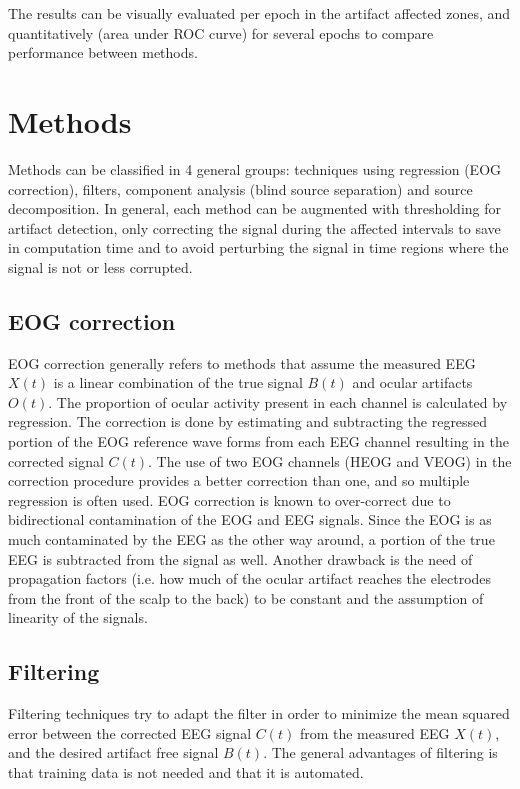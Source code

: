 \documentclass[twoside]{article}
\begin{document}
The results can be visually evaluated per epoch in the artifact affected zones, and quantitatively (area under ROC curve) for several epochs to compare performance between methods. 

\section{Methods}
Methods can be classified in 4 general groups: techniques using regression (EOG correction), filters, component analysis (blind source separation) and source decomposition. 
In general, each method can be augmented with thresholding for artifact detection, only correcting the signal during the affected intervals to save in computation time and to avoid perturbing the signal in time regions where the signal is not or less corrupted. 

\subsection{EOG correction \cite{ocularartifacts} \cite{eogcorrection} \cite{eogcorrection98}}
EOG correction generally refers to methods that assume the measured EEG $X(t)$ is a linear combination of the true signal $B(t)$ and ocular artifacts $O(t)$. The proportion of ocular activity present in each channel is calculated by regression. The correction is done by estimating and subtracting the regressed portion of the EOG reference wave forms from each EEG channel resulting in the corrected signal $C(t)$.  The use of two EOG channels (HEOG and VEOG) in the correction procedure provides a better correction than one, and so multiple regression is often used. EOG correction is known to over-correct due to bidirectional contamination of the EOG and EEG signals. Since the EOG is as much contaminated by the EEG as the other way around, a portion of the true EEG is subtracted from the signal as well. Another drawback is the need of propagation factors (i.e. how much of the ocular artifact reaches the electrodes from the front of the scalp to the back) to be constant and the assumption of linearity of the signals. 


\subsection{Filtering}
Filtering techniques try to adapt the filter in order to minimize the mean squared error between the corrected EEG signal $C(t)$ from the measured EEG $X(t)$, and the desired artifact free signal $B(t)$. The general advantages of filtering is that training data is not needed and that it is automated. 
\end{document}
